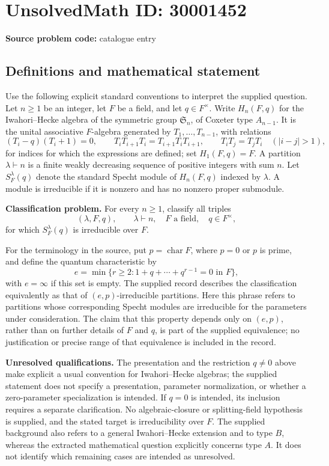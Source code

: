 \documentclass[11pt]{article}
\begin{document}
\section*{UnsolvedMath ID: 30001452}
\textbf{Source problem code:} catalogue entry
\subsection{Definitions and mathematical statement}
Use the following explicit standard conventions to interpret the supplied question. Let \(n\geq 1\) be an integer, let \(F\) be a field, and let \(q\in F^{\times}\). Write \(H_n(F,q)\) for the Iwahori--Hecke algebra of the symmetric group \(\mathfrak S_n\), of Coxeter type \(A_{n-1}\). It is the unital associative \(F\)-algebra generated by \(T_1,\ldots,T_{n-1}\), with relations
\[
(T_i-q)(T_i+1)=0,\qquad
T_iT_{i+1}T_i=T_{i+1}T_iT_{i+1},\qquad
T_iT_j=T_jT_i\quad (|i-j|>1),
\]
for indices for which the expressions are defined; set \(H_1(F,q)=F\). A partition \(\lambda\vdash n\) is a finite weakly decreasing sequence of positive integers with sum \(n\). Let \(S_F^{\lambda}(q)\) denote the standard Specht module of \(H_n(F,q)\) indexed by \(\lambda\). A module is irreducible if it is nonzero and has no nonzero proper submodule.

\textbf{Classification problem.} For every \(n\geq 1\), classify all triples
\[
(\lambda,F,q),\qquad \lambda\vdash n,\quad F\text{ a field},\quad q\in F^{\times},
\]
for which \(S_F^{\lambda}(q)\) is irreducible over \(F\).

For the terminology in the source, put \(p=\operatorname{char}F\), where \(p=0\) or \(p\) is prime, and define the quantum characteristic by
\[
e=\min\{r\geq 2:1+q+\cdots+q^{r-1}=0\text{ in }F\},
\]
with \(e=\infty\) if this set is empty. The supplied record describes the classification equivalently as that of \((e,p)\)-irreducible partitions. Here this phrase refers to partitions whose corresponding Specht modules are irreducible for the parameters under consideration. The claim that this property depends only on \((e,p)\), rather than on further details of \(F\) and \(q\), is part of the supplied equivalence; no justification or precise range of that equivalence is included in the record.

\textbf{Unresolved qualifications.} The presentation and the restriction \(q\ne 0\) above make explicit a usual convention for Iwahori--Hecke algebras; the supplied statement does not specify a presentation, parameter normalization, or whether a zero-parameter specialization is intended. If \(q=0\) is intended, its inclusion requires a separate clarification. No algebraic-closure or splitting-field hypothesis is supplied, and the stated target is irreducibility over \(F\). The supplied background also refers to a general Iwahori--Hecke extension and to type \(B\), whereas the extracted mathematical question explicitly concerns type \(A\). It does not identify which remaining cases are intended as unresolved.
\end{document}
